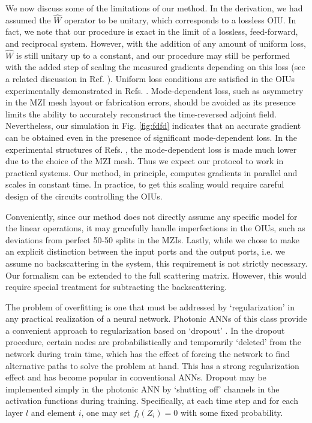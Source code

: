 
We now discuss some of the limitations of our method.  In the derivation, we had assumed the $\hat{W}$ operator to be unitary, which corresponds to a lossless OIU.  In fact, we note that our procedure is exact in the limit of a lossless, feed-forward, and reciprocal system.  However, with the addition of any amount of uniform loss, $\hat{W}$ is still unitary up to a constant, and our procedure may still be performed with the added step of scaling the measured gradients depending on this loss (see a related discussion in Ref. \cite{Miller2017}).  Uniform loss conditions are satisfied in the OIUs experimentally demonstrated in Refs. \cite{Shen2017, Miller2013}.  Mode-dependent loss, such as asymmetry in the MZI mesh layout or fabrication errors, should be avoided as its presence limits the ability to accurately reconstruct the time-reversed adjoint field.  Nevertheless, our simulation in Fig. \ref{fig:fdfd} indicates that an accurate gradient can be obtained even in the presence of significant mode-dependent loss.  In the experimental structures of  Refs. \cite{Shen2017, Miller2013}, the mode-dependent loss is made much lower due to the choice of the MZI mesh.  Thus we expect our protocol to work in practical systems.  Our method, in principle, computes gradients in parallel and scales in constant time.  In practice, to get this scaling would require careful design of the circuits controlling the OIUs.

Conveniently, since our method does not directly assume any specific model for the linear operations, it may gracefully handle imperfections in the OIUs, such as deviations from perfect 50-50 splits in the MZIs.  Lastly, while we chose to make an explicit distinction between the input ports and the output ports, i.e. we assume no backscattering in the system, this requirement is not strictly necessary. Our formalism can be extended to the full scattering matrix.  However, this would require special treatment for subtracting the backscattering. 

The problem of overfitting is one that must be addressed by `regularization' in any practical realization of a neural network.  Photonic ANNs of this class provide a convenient approach to regularization based on `dropout' \cite{srivastava2014dropout}.  In the dropout procedure, certain nodes are probabilistically and temporarily `deleted’ from the network during train time, which has the effect of forcing the network to find alternative paths to solve the problem at hand.  This has a strong regularization effect and has become popular in conventional ANNs.  Dropout may be implemented simply in the photonic ANN by `shutting off’ channels in the activation functions during training.  Specifically, at each time step and for each layer $l$ and element $i$, one may set $f_l(Z_i) = 0$ with some fixed probability.

